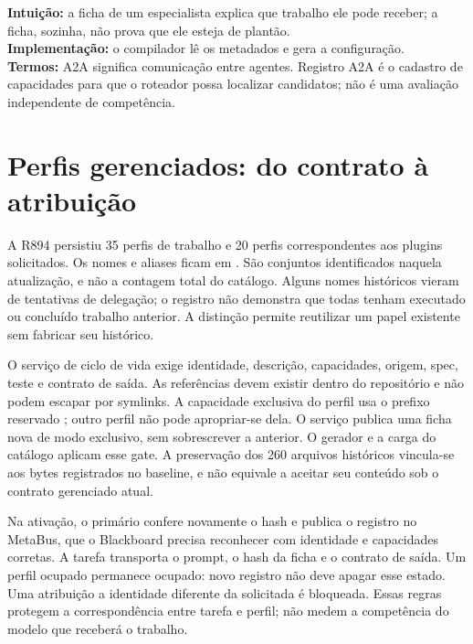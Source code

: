 \begin{niveis}
\textbf{Intuição:} a ficha de um especialista explica que trabalho ele pode
receber; a ficha, sozinha, não prova que ele esteja de plantão.\\
\textbf{Implementação:} o compilador lê os metadados e gera a configuração.\\
\textbf{Termos:} A2A significa comunicação entre agentes. Registro A2A é o
cadastro de capacidades para que o roteador possa localizar candidatos; não é
uma avaliação independente de competência.
\end{niveis}

\section{Perfis gerenciados: do contrato à atribuição}

\begin{descricao}
A R894 persistiu 35 perfis de trabalho e 20 perfis correspondentes aos plugins
solicitados. Os nomes e aliases ficam em .
São conjuntos identificados naquela atualização, e não a contagem total do
catálogo. Alguns nomes históricos vieram de tentativas de delegação; o registro
não demonstra que todas tenham executado ou concluído trabalho anterior.
A distinção permite reutilizar um papel existente sem fabricar seu histórico.
\end{descricao}

\begin{metodo}
O serviço de ciclo de vida exige identidade, descrição, capacidades, origem,
spec, teste e contrato de saída. As referências devem existir dentro do
repositório e não podem escapar por symlinks. A capacidade exclusiva do perfil
usa o prefixo reservado ; outro perfil não pode apropriar-se
dela. O serviço publica uma ficha nova de modo exclusivo, sem sobrescrever a
anterior. O gerador e a carga do catálogo aplicam esse gate. A preservação dos
260 arquivos históricos vincula-se aos bytes registrados no baseline, e não
equivale a aceitar seu conteúdo sob o contrato gerenciado atual.
\end{metodo}

\begin{descricao}
Na ativação, o primário confere novamente o hash e publica o registro no
MetaBus, que o Blackboard precisa reconhecer com identidade e capacidades
corretas. A tarefa transporta o prompt, o hash da ficha e o contrato de saída.
Um perfil ocupado permanece ocupado: novo registro não deve apagar esse estado.
Uma atribuição a identidade diferente da solicitada é bloqueada. Essas regras
protegem a correspondência entre tarefa e perfil; não medem a competência do
modelo que receberá o trabalho.
\end{descricao}

